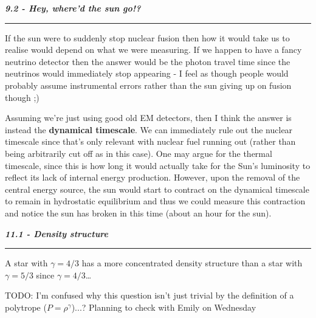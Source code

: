 \documentclass[12pt, letterpaper, twoside]{article}
\newcommand{\question}[1]{{\noindent \it #1}}
\newcommand{\answer}[1]{
    \par\noindent\rule{\textwidth}{0.4pt}#1\vspace{0.5cm}
}
\newcommand{\todo}[1]{{\color{red}\begin{center}TODO: #1\end{center}}}
\begin{document}
\question{\textbf{9.2 - Hey, where'd the sun go!?}}
\answer{
    If the sun were to suddenly stop nuclear fusion then how it would take us to realise would depend on what we were measuring. If we happen to have a fancy neutrino detector then the answer would be the photon travel time since the neutrinos would immediately stop appearing - I feel as though people would probably assume instrumental errors rather than the sun giving up on fusion though ;)

    Assuming we're just using good old EM detectors, then I think the answer is instead the \textbf{dynamical timescale}. We can immediately rule out the nuclear timescale since that's only relevant with nuclear fuel running out (rather than being arbitrarily cut off as in this case). One may argue for the thermal timescale, since this is how long it would actually take for the Sun's luminosity to reflect its lack of internal energy production. However, upon the removal of the central energy source, the sun would start to contract on the dynamical timescale to remain in hydrostatic equilibrium and thus we could measure this contraction and notice the sun has broken in this time (about an hour for the sun).
}

\question{\textbf{11.1 - Density structure}}
\answer{
    A star with $\gamma =4/3$ has a more concentrated density structure than a star with $\gamma =5/3$ since $\gamma = 4/3$\dots
    \todo{I'm confused why this question isn't just trivial by the definition of a polytrope ($P = \rho^{\gamma}$)...? Planning to check with Emily on Wednesday}

}
\end{document}
